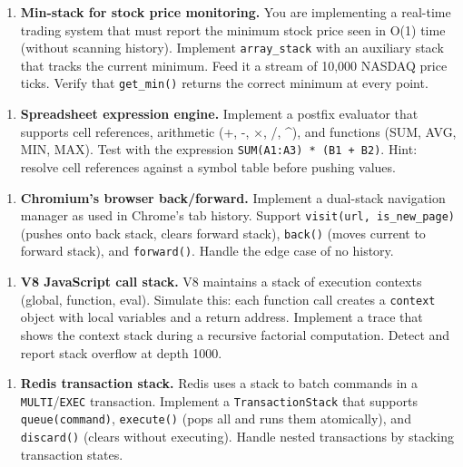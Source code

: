 \begin{enumerate}
\item \textbf{Min-stack for stock price monitoring.} You are implementing a real-time trading system that must report the minimum stock price seen in O(1) time (without scanning history). Implement \texttt{array\_stack} with an auxiliary stack that tracks the current minimum. Feed it a stream of 10,000 NASDAQ price ticks. Verify that \texttt{get\_min()} returns the correct minimum at every point.
\end{enumerate}

\begin{enumerate}
\item \textbf{Spreadsheet expression engine.} Implement a postfix evaluator that supports cell references, arithmetic (+, -, $\times $, /, \textasciicircum{}), and functions (SUM, AVG, MIN, MAX). Test with the expression \texttt{SUM(A1:A3) * (B1 + B2)}. Hint: resolve cell references against a symbol table before pushing values.
\end{enumerate}

\begin{enumerate}
\item \textbf{Chromium's browser back/forward.} Implement a dual-stack navigation manager as used in Chrome's tab history. Support \texttt{visit(url, is\_new\_page)} (pushes onto back stack, clears forward stack), \texttt{back()} (moves current to forward stack), and \texttt{forward()}. Handle the edge case of no history.
\end{enumerate}

\begin{enumerate}
\item \textbf{V8 JavaScript call stack.} V8 maintains a stack of execution contexts (global, function, eval). Simulate this: each function call creates a \texttt{context} object with local variables and a return address. Implement a trace that shows the context stack during a recursive factorial computation. Detect and report stack overflow at depth 1000.
\end{enumerate}

\begin{enumerate}
\item \textbf{Redis transaction stack.} Redis uses a stack to batch commands in a \texttt{MULTI}/\texttt{EXEC} transaction. Implement a \texttt{TransactionStack} that supports \texttt{queue(command)}, \texttt{execute()} (pops all and runs them atomically), and \texttt{discard()} (clears without executing). Handle nested transactions by stacking transaction states.
\end{enumerate}

